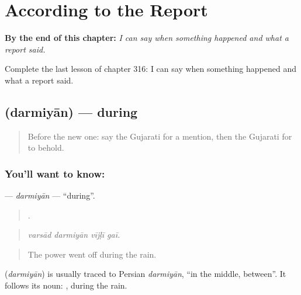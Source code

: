 
\chapter{According to the Report}
\label{ch:gu-according-to-the-report}

\begin{chapteropening}
\textbf{By the end of this chapter:} \emph{I can say when something happened and what a report said.}

Complete the last lesson of chapter 316: I can say when something happened and what a report said.
\end{chapteropening}

\section[\texorpdfstring{\gu{દરમિયાન} (darmiyān)}{દરમિયાન (darmiyān)}]{ (darmiyān) — during}

\label{lesson:GU-C316-darmiyan}



\begin{quote}
Before the new one: say the Gujarati for a mention, then the Gujarati for to behold.
\end{quote}

\subsection*{You'll want to know: }
\textbf{} — \emph{darmiyān} — \textquotedblleft{}during\textquotedblright{}.

\begin{quote}
   .
\end{quote}

\begin{quote}
\emph{varsād darmiyān vījḷī gaī.}
\end{quote}

\begin{quote}
The power went off during the rain.
\end{quote}

\begin{cousinweb}
\textbf{} (\emph{darmiyān}) is usually traced to Persian \emph{darmiyān}, \textquotedblleft{}in the middle, between\textquotedblright{}. It follows its noun: \textbf{ }, during the rain.
\end{cousinweb}


